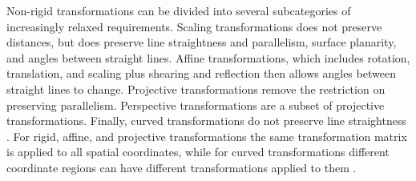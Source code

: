 \documentclass[a4paper,11pt]{article}
\begin{document}
        Non-rigid transformations can be divided into several subcategories of increasingly relaxed requirements. Scaling transformations does not preserve distances, but does preserve line straightness and parallelism, surface planarity, and angles between straight lines. Affine transformations, which includes rotation, translation, and scaling plus shearing and reflection then allows angles between straight lines to change. Projective transformations remove the restriction on preserving parallelism. Perspective transformations are a subset of projective transformations. Finally, curved transformations do not preserve line straightness \cite{fitzpatrick2000image}. For rigid, affine, and projective transformations the same transformation matrix is applied to all spatial coordinates, while for curved transformations different coordinate regions can have different transformations applied to them \cite{Chen2023ASO}. 
\end{document}
